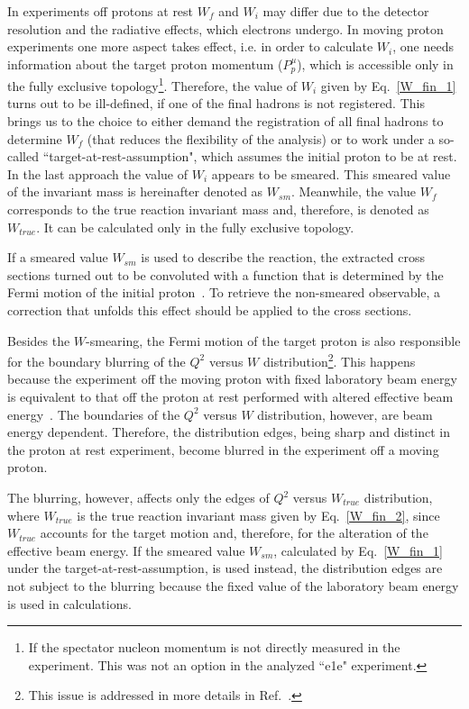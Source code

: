 In experiments off protons at rest $W_{f}$ and $W_{i}$ may differ due to the detector resolution and the radiative effects, which electrons undergo. In moving proton experiments one more aspect takes effect, i.e. in order to calculate $W_{i}$, one needs information about the target proton momentum ($P_{p}^{\mu}$), which is accessible only in the fully exclusive topology\footnote[2]{If the spectator nucleon momentum is not directly measured in the experiment. This was not an option in the analyzed ``e1e" experiment. }. Therefore, the value of  $W_{i}$ given by Eq.~\eqref{W_fin_1} turns out to be ill-defined, if one of the final hadrons is not registered. This brings us to the choice to either demand the registration of all final hadrons to determine $W_{f}$ (that reduces the flexibility of the analysis) or to work under a so-called ``target-at-rest-assumption", which assumes the initial proton to be at rest. In the last approach the value of $W_{i}$ appears to be smeared. This smeared value of the invariant mass is hereinafter denoted as $W_{sm}$. Meanwhile, the value $W_{f}$ corresponds to the true reaction invariant mass and, therefore, is denoted as $W_{true}$. It can be calculated only in the fully exclusive topology.

If a smeared value $W_{sm}$ is used to describe the reaction, the extracted cross sections turned out to be convoluted with a function that is determined by the Fermi motion of the initial proton~\cite{Skorodumina:2015rea,twopeg-d}. To retrieve the non-smeared observable, a correction that unfolds this effect should be applied to the cross sections.


Besides the $W$-smearing, the Fermi motion of the target proton is also responsible for the boundary blurring of the $Q^{2}$ versus $W$ distribution\footnote[3]{This issue is addressed in more details in Ref.~\cite{twopeg-d}.}. This happens because the experiment off the moving proton with fixed laboratory beam energy is equivalent to that off the proton at rest performed with altered effective beam energy~\cite{twopeg-d}. The boundaries of the $Q^{2}$ versus $W$ distribution, however, are beam energy dependent. Therefore, the distribution edges, being sharp and distinct in the proton at rest experiment, become blurred in the experiment off a moving proton.


The blurring, however, affects only the edges of $Q^{2}$ versus $W_{true}$ distribution, where $W_{true}$ is the true reaction invariant mass given by Eq.~\eqref{W_fin_2}, since $W_{true}$ accounts for the target motion and, therefore, for the alteration of the effective beam energy. If the smeared value $W_{sm}$, calculated by Eq.~\eqref{W_fin_1} under the target-at-rest-assumption, is used instead, the distribution edges are not subject to the blurring because the fixed value of the laboratory beam energy is used in calculations.

